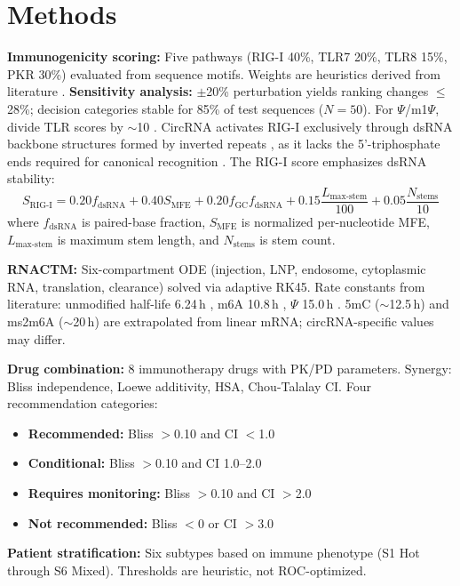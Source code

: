 \documentclass{article}
\begin{document}
\section{Methods}
\textbf{Immunogenicity scoring:} Five pathways (RIG-I 40\%, TLR7 20\%, TLR8 15\%, PKR 30\%) evaluated from sequence motifs. Weights are heuristics derived from literature \citep{zhang2016,nallagatla2007}. \textbf{Sensitivity analysis:} $\pm$20\% perturbation yields ranking changes $\leq$28\%; decision categories stable for 85\% of test sequences ($N=50$). For $\Psi$/m1$\Psi$, divide TLR scores by $\sim$10 \citep{anderson2019,kariko2005}. CircRNA activates RIG-I exclusively through dsRNA backbone structures formed by inverted repeats \citep{zhang2016}, as it lacks the 5'-triphosphate ends required for canonical recognition \citep{schlee2009}. The RIG-I score emphasizes dsRNA stability:
\begin{equation}
S_{\text{RIG-I}} = 0.20 f_{\text{dsRNA}} + 0.40 S_{\text{MFE}} + 0.20 f_{\text{GC}} f_{\text{dsRNA}} + 0.15 \frac{L_{\text{max-stem}}}{100} + 0.05 \frac{N_{\text{stems}}}{10}
\end{equation}
where $f_{\text{dsRNA}}$ is paired-base fraction, $S_{\text{MFE}}$ is normalized per-nucleotide MFE, $L_{\text{max-stem}}$ is maximum stem length, and $N_{\text{stems}}$ is stem count.

\textbf{RNACTM:} Six-compartment ODE (injection, LNP, endosome, cytoplasmic RNA, translation, clearance) solved via adaptive RK45. Rate constants from literature: unmodified half-life 6.24\,h \citep{wesselhoeft2018}, m6A 10.8\,h \citep{chen2019}, $\Psi$ 15.0\,h \citep{liu2023}. 5mC ($\sim$12.5\,h) and ms2m6A ($\sim$20\,h) are extrapolated from linear mRNA; circRNA-specific values may differ.

\textbf{Drug combination:} 8 immunotherapy drugs with PK/PD parameters. Synergy: Bliss independence, Loewe additivity, HSA, Chou-Talalay CI. Four recommendation categories:

\begin{itemize}
\item \textbf{Recommended:} Bliss $>$0.10 and CI $<$1.0
\item \textbf{Conditional:} Bliss $>$0.10 and CI 1.0--2.0
\item \textbf{Requires monitoring:} Bliss $>$0.10 and CI $>$2.0
\item \textbf{Not recommended:} Bliss $<$0 or CI $>$3.0
\end{itemize}

\textbf{Patient stratification:} Six subtypes based on immune phenotype (S1 Hot through S6 Mixed). Thresholds are heuristic, not ROC-optimized.
\end{document}
